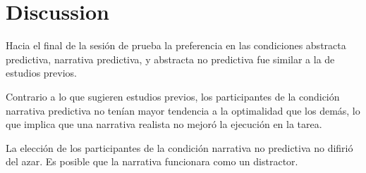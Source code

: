 \documentclass[a4paper,12pt]{article}
\begin{document}
\section{Discussion}

Hacia el final de la sesión de prueba la preferencia en las condiciones abstracta predictiva, narrativa predictiva, y abstracta no predictiva fue similar a la de estudios previos.

Contrario a lo que sugieren estudios previos, los participantes de la condición narrativa predictiva no tenían mayor tendencia a la optimalidad que los demás, lo que implica que una narrativa realista no mejoró la ejecución en la tarea.

La elección de los participantes de la condición narrativa no predictiva no difirió del azar.
Es posible que la narrativa funcionara como un distractor.
\end{document}
